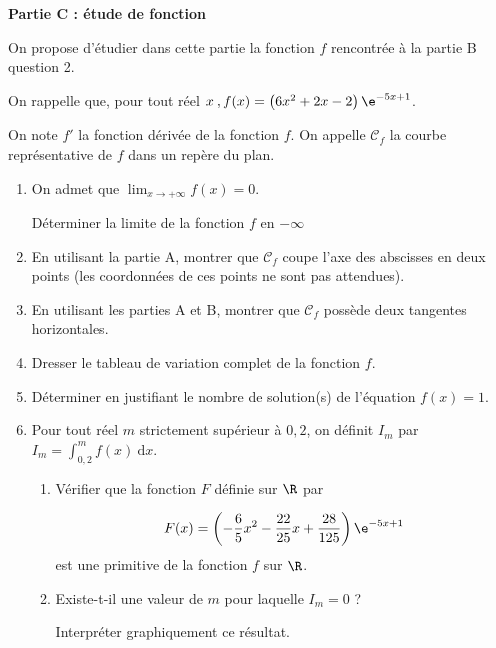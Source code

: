 \medskip

\textbf{Partie C : étude de fonction}

\medskip

On propose d'étudier dans cette partie la fonction $f$ rencontrée à la partie B question 2. 

On rappelle que, pour tout réel $x\:, f(x) = \left(6x^2 + 2x - 2\right)\e^{-5x+ 1}$.

On note $f'$ la fonction dérivée de la fonction $f$. On appelle $\mathcal{C}_f$ la courbe représentative de $f$ dans un repère du plan.

\medskip

\begin{enumerate}
\item On admet que $\displaystyle\lim_{x \to + \infty} f(x) = 0$.

Déterminer la limite de la fonction $f$ en $- \infty$
\item En utilisant la partie A, montrer que $\mathcal{C}_f$ coupe l'axe des abscisses en deux points (les coordonnées de ces points ne sont pas attendues).
\item En utilisant les parties A et B, montrer que $\mathcal{C}_f$ possède deux tangentes horizontales.
\item Dresser le tableau de variation complet de la fonction $f$.
\item Déterminer en justifiant le nombre de solution(s) de l'équation $f(x)= 1$.
\item Pour tout réel $m$ strictement supérieur à $0,2$, on définit $I_m$ par $I_m = \displaystyle\int_{0,2}^m f(x)\:\text{d}x$.
	\begin{enumerate}
		\item Vérifier que la fonction $F$ définie sur $\R$ par

\[F(x) = \left(-\dfrac65 x^2 - \dfrac{22}{25}x + \dfrac{28}{125}\right)\e^{-5x+ 1}\]
est une primitive de la fonction $f$ sur $\R$.
		\item Existe-t-il une valeur de $m$ pour laquelle $I_m = 0$ ? 

Interpréter graphiquement ce résultat.
	\end{enumerate}
\end{enumerate}

